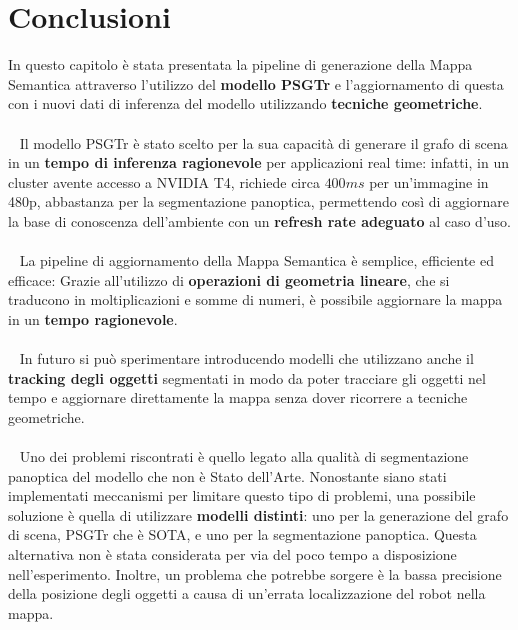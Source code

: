 \section{Conclusioni}
In questo capitolo è stata presentata la pipeline di generazione della Mappa Semantica attraverso l'utilizzo del \textbf{modello PSGTr} e l'aggiornamento di questa con i nuovi dati di inferenza del modello utilizzando \textbf{tecniche geometriche}.\\\\
~
Il modello PSGTr è stato scelto per la sua capacità di generare il grafo di scena in un \textbf{tempo di inferenza ragionevole} per applicazioni real time: infatti, in un cluster avente accesso a NVIDIA T4, richiede circa $400ms$ per un'immagine in 480p, abbastanza per la segmentazione panoptica, permettendo così di aggiornare la base di conoscenza dell'ambiente con un \textbf{refresh rate adeguato} al caso d'uso.\\\\
~
La pipeline di aggiornamento della Mappa Semantica è semplice, efficiente ed efficace: Grazie all'utilizzo di \textbf{operazioni di geometria lineare}, che si traducono in moltiplicazioni e somme di numeri, è possibile aggiornare la mappa in un \textbf{tempo ragionevole}.\\\\
~
In futuro si può sperimentare introducendo modelli \cite{yang2023pvsg} che utilizzano anche il \textbf{tracking degli oggetti} segmentati in modo da poter tracciare gli oggetti nel tempo e aggiornare direttamente la mappa senza dover ricorrere a tecniche geometriche.\\\\
~
Uno dei problemi riscontrati è quello legato alla qualità di segmentazione panoptica del modello che non è Stato dell'Arte. Nonostante siano stati implementati meccanismi per limitare questo tipo di problemi, una possibile soluzione è quella di utilizzare \textbf{modelli distinti}: uno per la generazione del grafo di scena, PSGTr che è SOTA, e uno per la segmentazione panoptica. Questa alternativa non è stata considerata per via del poco tempo a disposizione nell'esperimento. Inoltre, un problema che potrebbe sorgere è la bassa precisione della posizione degli oggetti a causa di un'errata localizzazione del robot nella mappa.
